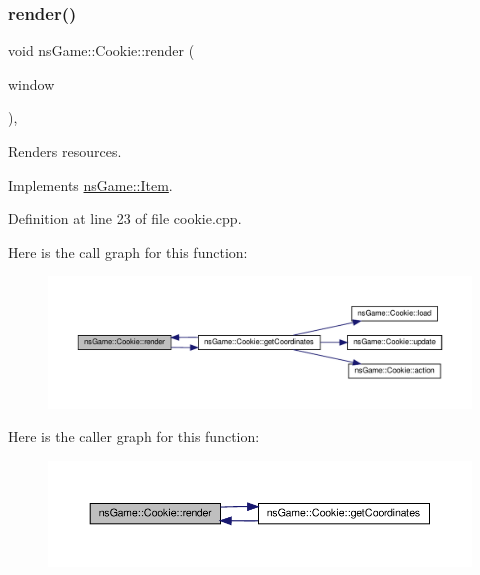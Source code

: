 \subsubsection{\texorpdfstring{render()}{render()}}
{\footnotesize\ttfamily void ns\+Game\+::\+Cookie\+::render (\begin{DoxyParamCaption}\item[{Min\+GL \&}]{window }\end{DoxyParamCaption})\hspace{0.3cm}{\ttfamily [override]}, {\ttfamily [virtual]}}



Renders resources. 



Implements \hyperlink{structns_game_1_1_item_a451b6491efc475c9ca47dcccdbbde707}{ns\+Game\+::\+Item}.



Definition at line 23 of file cookie.\+cpp.

Here is the call graph for this function\+:\nopagebreak
\begin{figure}[H]
\begin{center}
\leavevmode
\includegraphics[width=350pt]{classns_game_1_1_cookie_a7e321497bf9d9baa738d987e9c47dd5e_cgraph}
\end{center}
\end{figure}
Here is the caller graph for this function\+:\nopagebreak
\begin{figure}[H]
\begin{center}
\leavevmode
\includegraphics[width=350pt]{classns_game_1_1_cookie_a7e321497bf9d9baa738d987e9c47dd5e_icgraph}
\end{center}
\end{figure}
\mbox{\label{classns_game_1_1_cookie_aaea5c3967effe908f2676a5ded17aa39}} 
